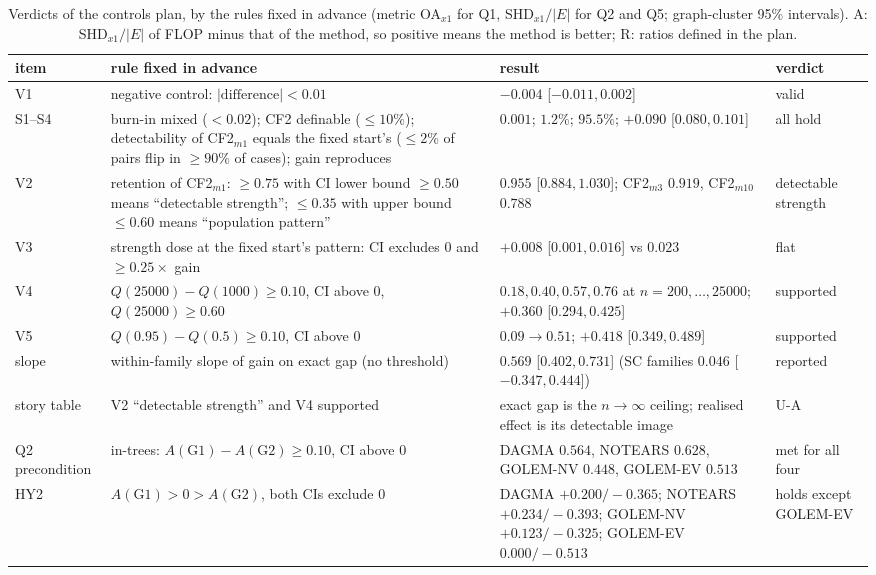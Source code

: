 \begin{table}[ht]
\caption{Verdicts of the controls plan, by the rules fixed in advance (metric
OA$_{x1}$ for Q1, SHD$_{x1}/|E|$ for Q2 and Q5; graph-cluster 95\% intervals).
A: SHD$_{x1}/|E|$ of FLOP minus that of the method, so positive means the method
is better; R: ratios defined in the plan.}
\label{tab:b1yverdicts}
\centering\footnotesize
\setlength{\tabcolsep}{3pt}
\begin{tabular}{>{\raggedright\arraybackslash}p{}>{\raggedright\arraybackslash}p{}>{\raggedright\arraybackslash}p{}>{\raggedright\arraybackslash}p{}}
\toprule
item & rule fixed in advance & result & verdict \\
\midrule
V1 & negative control: $|\text{difference}|<0.01$ & $-0.004$ [$-0.011,0.002$] & valid \\
S1--S4 & burn-in mixed ($<0.02$); CF2 definable ($\le10\%$); detectability of CF2$_{m1}$ equals the fixed start's ($\le2\%$ of pairs flip in $\ge90\%$ of cases); gain reproduces & $0.001$; $1.2\%$; $95.5\%$; $+0.090$ [$0.080,0.101$] & all hold \\
V2 & retention of CF2$_{m1}$: $\ge0.75$ with CI lower bound $\ge0.50$ means ``detectable strength''; $\le0.35$ with upper bound $\le0.60$ means ``population pattern'' & $0.955$ [$0.884,1.030$]; CF2$_{m3}$ $0.919$, CF2$_{m10}$ $0.788$ & detectable strength \\
V3 & strength dose at the fixed start's pattern: CI excludes $0$ and $\ge0.25\times$ gain & $+0.008$ [$0.001,0.016$] vs $0.023$ & flat \\
V4 & $Q(25000)-Q(1000)\ge0.10$, CI above $0$, $Q(25000)\ge0.60$ & $0.18,0.40,0.57,0.76$ at $n=200,\dots,25000$; $+0.360$ [$0.294,0.425$] & supported \\
V5 & $Q(0.95)-Q(0.5)\ge0.10$, CI above $0$ & $0.09\to0.51$; $+0.418$ [$0.349,0.489$] & supported \\
slope & within-family slope of gain on exact gap (no threshold) & $0.569$ [$0.402,0.731$] (SC families $0.046$ [$-0.347,0.444$]) & reported \\
story table & V2 ``detectable strength'' and V4 supported & exact gap is the $n\to\infty$ ceiling; realised effect is its detectable image & U-A \\
\midrule
Q2 precondition & in-trees: $A(\text{G1})-A(\text{G2})\ge0.10$, CI above $0$ & DAGMA $0.564$, NOTEARS $0.628$, GOLEM-NV $0.448$, GOLEM-EV $0.513$ & met for all four \\
HY2 & $A(\text{G1})>0>A(\text{G2})$, both CIs exclude $0$ & DAGMA $+0.200/-0.365$; NOTEARS $+0.234/-0.393$; GOLEM-NV $+0.123/-0.325$; GOLEM-EV $0.000/-0.513$ & holds except GOLEM-EV \\

\end{tabular}
\end{table}
